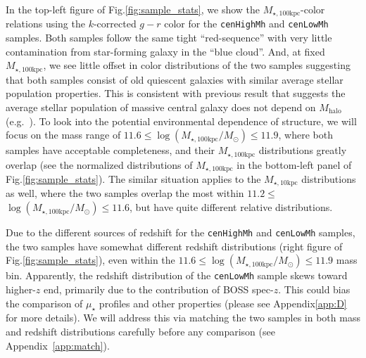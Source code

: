 \documentclass{emulateapj}
\def\rbcg{\texttt{cenHighMh}}
\def\nbcg{\texttt{cenLowMh}}
\def\mhalo{{$M_{\mathrm{halo}}$}}
\def\minn{{$M_{\star,10\mathrm{kpc}}$}}
\def\mtot{{$M_{\star,100\mathrm{kpc}}$}}
\def\logmtot{{$\log (M_{\star,100\mathrm{kpc}}/M_{\odot})$}}
\def\mden{{$\mu_{\star}$}}
\newcommand{\update}[1]{\textcolor{Bittersweet}{#1}}
\begin{document}
\begin{CJK*}{UTF8}{gbsn}
    \update{
    In the top-left figure of Fig.\ref{fig:sample_stats}, we show the \mtot{}-color 
    relations using the $k$-corrected $g-r$ color for the \rbcg{} and \nbcg{} 
    samples. 
    Both samples follow the same tight ``red-sequence'' with very little contamination 
    from star-forming galaxy in the ``blue cloud''.
    And, at fixed \mtot{}, we see little offset in color distributions of the two 
    samples suggesting that both samples consist of old quiescent galaxies with 
    similar average stellar population properties.  
    This is consistent with previous result that suggests the average stellar 
    population of massive central galaxy does not depend on \mhalo{} 
    (e.g.\ \citealt{Park2007}).  
    To look into the potential environmental dependence of structure, we will 
    focus on the mass range of $11.6 \le$\logmtot{}$\le 11.9$, where both samples 
    have acceptable completeness, and their \mtot{} distributions greatly overlap
    (see the normalized distributions of \mtot{} in the bottom-left panel of 
    Fig.\ref{fig:sample_stats}). 
    The similar situation applies to the \minn{} distributions as well, where 
    the two samples overlap the most within $11.2 \le$\logmtot{}$\le 11.6$, but 
    have quite different relative distributions.}
    
    \update{
    Due to the different sources of redshift for the \rbcg{} and \nbcg{} samples, 
    the two samples have somewhat different redshift distributions 
    (right figure of Fig.\ref{fig:sample_stats}), even within the 
    $11.6 \le$\logmtot{}$\le 11.9$ mass bin.  
    Apparently, the redshift distribution of the \nbcg{} sample skews toward 
    higher-$z$ end, primarily due to the contribution of BOSS spec-$z$.
    This could bias the comparison of \mden{} profiles and other properties 
    (please see Appendix\ref{app:D} for more details).  
    We will address this via matching the two samples in both mass and redshift
    distributions carefully before any comparison (see Appendix~\ref{app:match}).}
    

\end{CJK*}
\end{document}
